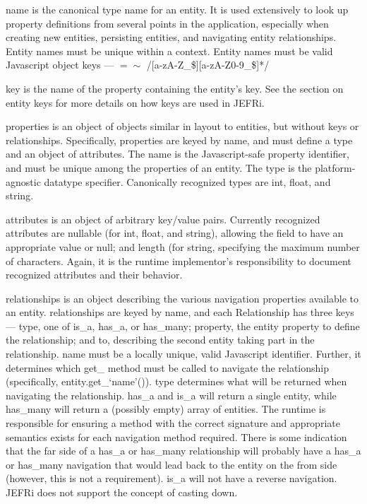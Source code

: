 \documentclass{article}
\begin{document}
{\ilcode name} is the canonical type name for an entity. It is used extensively
to look up property definitions from several points in the application,
especially when creating new entities, persisting entities, and navigating
entity relationships. Entity names must be unique within a context. Entity names
must be valid Javascript object keys --- {\ilcode $=\sim$
/[a-zA-Z\_\$][a-zA-Z0-9\_\$]*/}

{\ilcode key} is the name of the property containing the entity's key. See the
section on entity keys for more details on how keys are used in JEFRi.

{\ilcode properties} is an object of objects similar in layout to entities, but
without keys or relationships. Specifically, properties are keyed by name, and
must define a type and an object of attributes. The name is the Javascript-safe
property identifier, and must be unique among the properties of an entity. The
type is the platform- agnostic datatype specifier. Canonically recognized types
are {\ilcode int}, {\ilcode float}, and {\ilcode string}.

{\ilcode attributes} is an object of arbitrary key/value pairs. Currently
recognized attributes are {\ilcode nullable} (for {\ilcode int}, {\ilcode
float}, and {\ilcode string}), allowing the field to have an appropriate value
or {\ilcode null}; and {\ilcode length} (for {\ilcode string}, specifying the
maximum number of characters. Again, it is the runtime implementor's
responsibility to document recognized attributes and their behavior.

{\ilcode relationships} is an object describing the various navigation
properties available to an entity. {\ilcode relationships} are keyed by name,
and each Relationship has three keys --- {\ilcode type}, one of {\ilcode is\_a},
{\ilcode has\_a}, or {\ilcode has\_many}; {\ilcode property}, the entity
property to define the relationship; and {\ilcode to}, describing the second
entity taking part in the relationship. {\ilcode name} must be a locally unique,
valid Javascript identifier. Further, it determines which {\ilcode get\_} method
must be called to navigate the relationship (specifically, {\ilcode
entity.get\_`name'()}). {\ilcode type} determines what will be returned when
navigating the relationship. {\ilcode has\_a} and {\ilcode is\_a} will return a
single entity, while {\ilcode has\_many} will return a (possibly empty) array of
entities. The runtime is responsible for ensuring a method with the correct
signature and appropriate semantics exists for each navigation method required.
There is some indication that the far side of a {\ilcode has\_a} or {\ilcode
has\_many} relationship will probably have a {\ilcode has\_a} or {\ilcode
has\_many} navigation that would lead back to the entity on the from side
(however, this is not a requirement). {\ilcode is\_a} will not have a reverse
navigation. JEFRi does not support the concept of casting down.
\end{document}
